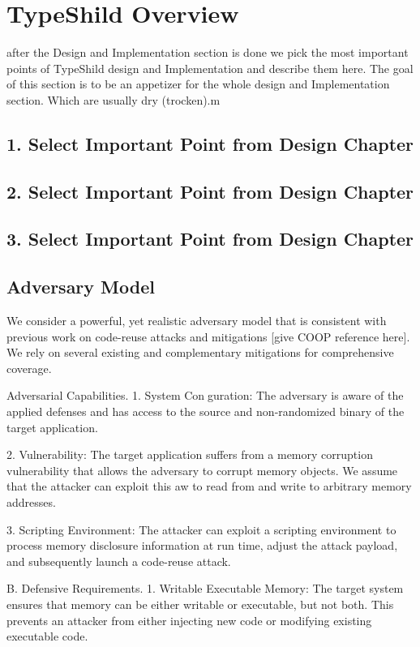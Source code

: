 \chapter{TypeShild Overview}
\label{chapter:TypeShild Overview}

after the Design and Implementation section is done
we pick the most important points of TypeShild design and Implementation and describe them here.
The goal of this section is to be an appetizer for the whole design and Implementation section.
Which are usually dry (trocken).m

\section{1. Select Important Point from Design Chapter}
\section{2. Select Important Point from Design Chapter}
\section{3. Select Important Point from Design Chapter}

\section{Adversary Model}
\label{Adversary Model}

We consider a powerful, yet realistic adversary model that
is consistent with previous work on code-reuse attacks and
mitigations [give COOP reference here]. We rely on several existing
and complementary mitigations for comprehensive coverage.

Adversarial Capabilities.
 1. System Conguration: The adversary is aware of
the applied defenses and has access to the source and
non-randomized binary of the target application.


2. Vulnerability: The target application suffers from a
memory corruption vulnerability that allows the adversary
to corrupt memory objects. We assume that the
attacker can exploit this
aw to read from and write
to arbitrary memory addresses.


3. Scripting Environment: The attacker can exploit
a scripting environment to process memory disclosure information at run time, adjust the attack payload, and
subsequently launch a code-reuse attack.

B. Defensive Requirements.
1. Writable Executable Memory: The target system
ensures that memory can be either writable or
executable, but not both. This prevents an attacker
from either injecting new code or modifying existing
executable code.

